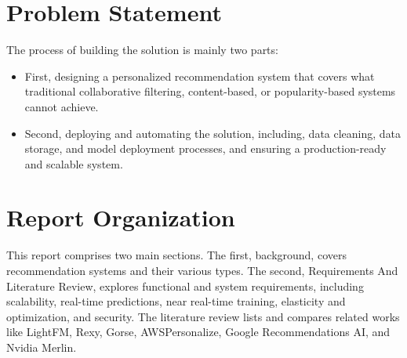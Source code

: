 \section{Problem Statement}

The process of building the solution is mainly two parts:

\begin{itemize}
    \item First, designing a personalized recommendation system that covers what traditional collaborative filtering, content-based, or popularity-based systems cannot achieve.
    \item Second, deploying and automating the solution, including, data cleaning, data storage, and model deployment processes, and ensuring a production-ready and scalable system.
\end{itemize}
\section{Report Organization}
This report comprises two main sections. The first, background, covers recommendation systems and their various types. The second, Requirements And Literature Review, explores functional and system requirements, including scalability, real-time predictions, near real-time training, elasticity and optimization, and security. The literature review lists and compares related works like LightFM, Rexy, Gorse, AWSPersonalize, Google Recommendations AI, and Nvidia Merlin.



